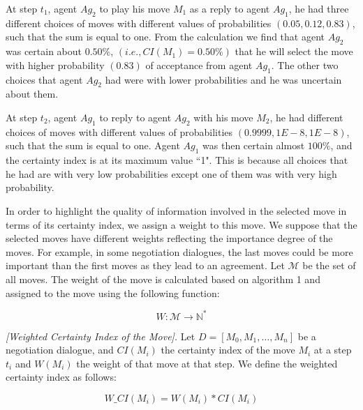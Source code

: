 \begin{example}
At step $t_1$, agent $Ag_2$ to play his move $M_1$ as a reply to agent $Ag_1$, he had three different choices of moves  with
different values of probabilities $(0.05, 0.12, 0.83)$, such that the sum is equal to one. From the calculation we find that agent
$Ag_2$ was certain about $0.50 \%$, $(i.e., CI(M_1)= 0.50 \%)$ that he will select the move with higher probability $(0.83)$ of
acceptance from agent $Ag_1$. The other two choices that agent $Ag_2$ had were with lower probabilities and he was uncertain
about them.

At step $t_2$, agent $Ag_1$ to reply to agent $Ag_2$ with his move $M_2$, he had different choices of moves with different values of
probabilities $(0.9999,1E-8,1E-8)$, such that the sum is equal to one. Agent $Ag_1$ was then certain almost $100 \%$, and the
certainty index is at its maximum value ``1". This is because all choices that he had are with very low probabilities except one of
them was with very high probability.
\end{example}

In order to highlight the quality of information involved in the selected move in terms of its certainty index, we assign a weight
to this move. We suppose that the selected moves have different weights reflecting the importance degree of the moves. For
example, in some negotiation dialogues, the last moves could be more important than the first moves as they lead to an agreement.
Let $\mathcal{M}$ be the set of all moves. The weight of the move is calculated based on algorithm 1 and assigned to the move using
the following function:

\begin{equation}\label{equation10}
W: \mathcal{M} \rightarrow \mathbb{N}^*
\end{equation}

\begin{definition}{\emph{[Weighted Certainty Index of the Move].}} \label{WeightedCI}
Let $D=[M_0, M_1, \ldots, M_n]$ be a negotiation dialogue, and $CI(M_i)$ the certainty index of the move $M_i$ at a step $t_i$
and $W(M_i)$ the weight of that move at that step. We define the weighted certainty index as follows:

\begin{equation}\label{equation11}
W\_CI(M_i) = W(M_i)*CI(M_i)
\end{equation}

\end{definition}


